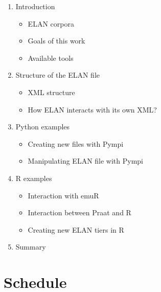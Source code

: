 \documentclass[]{book}
\providecommand{\tightlist}{%
  \setlength{\itemsep}{0pt}\setlength{\parskip}{0pt}}
\theoremstyle{definition}
\theoremstyle{definition}
\theoremstyle{definition}
\theoremstyle{remark}
\begin{document}
\begin{enumerate}
\def\labelenumi{\arabic{enumi}.}
\tightlist
\item
  Introduction

  \begin{itemize}
  \tightlist
  \item
    ELAN corpora
  \item
    Goals of this work
  \item
    Available tools
  \end{itemize}
\item
  Structure of the ELAN file

  \begin{itemize}
  \tightlist
  \item
    XML structure
  \item
    How ELAN interacts with its own XML?
  \end{itemize}
\item
  Python examples

  \begin{itemize}
  \tightlist
  \item
    Creating new files with Pympi
  \item
    Manipulating ELAN file with Pympi
  \end{itemize}
\item
  R examples

  \begin{itemize}
  \tightlist
  \item
    Interaction with emuR
  \item
    Interaction between Praat and R
  \item
    Creating new ELAN tiers in R
  \end{itemize}
\item
  Summary
\end{enumerate}

\section{Schedule}\label{schedule}
\end{document}
